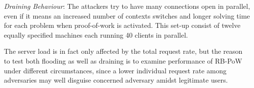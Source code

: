 \emph{Draining Behaviour}: The attackers try to have many connections open in parallel, even if it means an increased number of contexts switches and longer solving time for each problem when proof-of-work is activated. This set-up consist of twelve equally specified machines each running 40 clients in parallel.

The server load is in fact only affected by the total request rate, but the reason to test both flooding as well as draining is to examine performance of RB-PoW under different circumstances, since a lower individual request rate among adversaries may well disguise concerned adversary amidst legitimate users.


